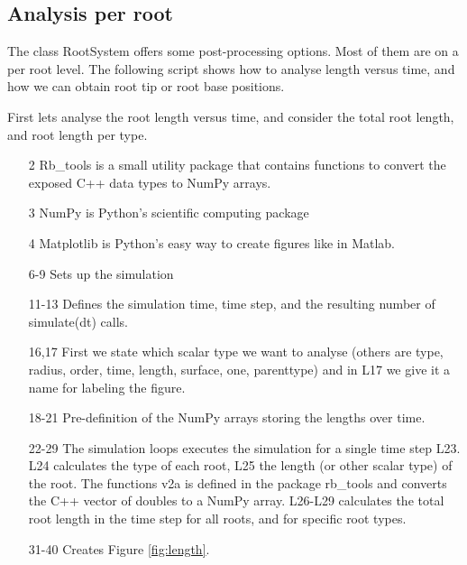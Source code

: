 \documentclass[a4paper]{article}
\begin{document}
\subsection{Analysis per root}

The class RootSystem offers some post-processing options. Most of them are on a per root level. 
The following script shows how to analyse length versus time, and how we can obtain root tip or root base positions. 

First lets analyse the root length versus time, and consider the total root length, and root length per type. 



\begin{itemize}

\item[2] Rb\_tools is a small utility package that contains functions to convert the exposed C++ data types to NumPy arrays. 
\item[3] NumPy is Python's scientific computing package
\item[4] Matplotlib is Python's easy way to create figures like in Matlab.

\item[6-9] Sets up the simulation

\item[11-13] Defines the simulation time, time step, and the resulting number of simulate(dt) calls. 

\item[16,17] First we state which scalar type we want to analyse (others are type, radius, order, time, length, surface, one, parenttype) and in L17 we give it a name for labeling the figure. 

\item[18-21] Pre-definition of the NumPy arrays storing the lengths over time. 

\item[22-29] The simulation loops executes the simulation for a single time step L23. L24 calculates the type of each root, L25 the length (or other scalar type) of the root. 
The functions v2a is defined in the package rb\_tools and converts the C++ vector of doubles to a NumPy array. L26-L29 calculates the total root length in the time step for all roots, and for specific root types.

\item[31-40] Creates Figure \ref{fig:length}.

\end{itemize}
\end{document}
